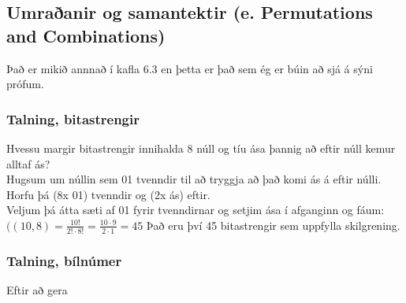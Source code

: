 \subsection{Umraðanir og samantektir (e. Permutations and Combinations)}
Það er mikið annnað í kafla 6.3 en þetta er það sem ég er búin að sjá á sýni prófum.
\subsubsection{Talning, bitastrengir}
Hvessu margir bitastrengir innihalda 8 núll og tíu ása þannig að eftir núll kemur alltaf ás?\vspace*{0.5em}\\
Hugsum um núllin sem 01 tvenndir til að tryggja að það komi ás á eftir núlli.\\
Horfu þá (8x 01) tvenndir og (2x ás) eftir.\vspace*{0.5em}\\
Veljum þá átta sæti af 01 fyrir tvenndirnar og setjim ása í afganginn og fáum:\vspace*{0.5em}\\
$((10,8) = \frac{10!}{2!\cdot 8!} = \frac{10 \cdot 9}{2 \cdot 1} = 45$ Það eru því 45 bitastrengir sem uppfylla skilgrening.

\subsubsection{Talning, bílnúmer}
Eftir að gera




\newpage